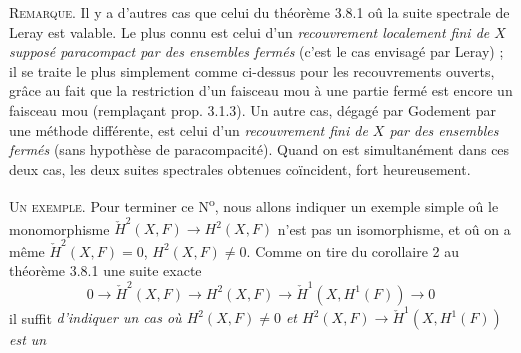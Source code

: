 \textsc{Remarque.} Il y a d'autres cas que celui du théorème 3.8.1 oû
la suite spectrale de Leray est valable. Le plus connu est celui d'un
\textit{recouvrement localement fini de $X$ supposé paracompact par des
ensembles fermés} (c'est le cas envisagé par Leray) ; il se traite le plus
simplement comme ci-dessus pour les recouvrements ouverts, grâce au fait que
la restriction d'un faisceau mou à une partie fermé est encore un faisceau mou
(remplaçant prop. 3.1.3). Un autre cas, dégagé par Godement par une méthode
différente, est celui d'un \textit{recouvrement fini de $X$ par des ensembles
fermés} (sans hypothèse de paracompacité). Quand on est simultanément dans ces
deux cas, les deux suites spectrales obtenues coïncident, fort heureusement.

\textsc{Un exemple.} Pour terminer ce N\textsuperscript{o}, nous
allons indiquer un exemple simple oû le monomorphisme
$\check H^2(X,F)\to H^2(X,F)$ n'est pas un isomorphisme, et oû on
a même $\check H^2(X,F)=0$, $H^2(X,F)\neq 0$. Comme on tire du corollaire 2 au
théorème 3.8.1 une suite exacte
\[
0\to\check H^2(X,F)\to H^2(X,F)
\to\check H^1(X,H^1(F))\to 0
\]
il suffit \textit{d'indiquer un cas où $H^2(X,F)\neq 0$ et
$H^2(X,F)\to\check H^1(X,H^1(F))$ est un}

